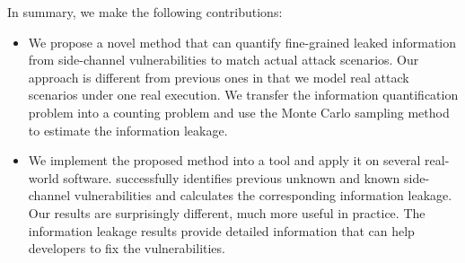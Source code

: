 


In summary, we make the following contributions:

\begin{itemize}
      \item We propose a novel method that can quantify fine-grained leaked
            information from side-channel vulnerabilities to match actual attack
            scenarios. Our approach is different from previous ones in that we
            model real attack scenarios under one real execution. 
            We transfer the information quantification problem into a counting problem 
            and use the Monte Carlo sampling method to estimate the information leakage.
   
      \item We implement the proposed method into a tool and apply it
            on several real-world software. \tool{} successfully identifies
            previous unknown and known side-channel vulnerabilities and calculates the
            corresponding information leakage. 
            Our results are surprisingly different, much more useful in practice.
            The information leakage results provide detailed information that can 
            help developers to fix the vulnerabilities.
\end{itemize}
